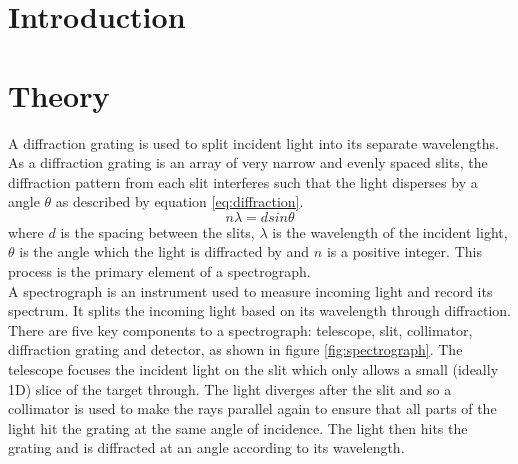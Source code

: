 \documentclass[a4paper,12pt,twocolumn]{article}
\let\cite=\supercite
\begin{document}
	\section{Introduction}
	
	\section{Theory}
		A diffraction grating is used to split incident light into its separate wavelengths. As a diffraction grating is an array of very narrow and evenly spaced slits, the diffraction pattern from each slit interferes such that the light disperses by a angle $\theta$ as described by equation \ref{eq:diffraction}\cite{universityPhysics}.
		\begin{equation}
			n \lambda = d sin\theta
			\label{eq:diffraction}
		\end{equation} where $d$ is the spacing between the slits, $\lambda$ is the wavelength of the incident light, $\theta$ is the angle which the light is diffracted by and $n$ is a positive integer. This process is the primary element of a spectrograph.\\
	
		A spectrograph is an instrument used to measure incoming light and record its spectrum\cite{atnf}. It splits the incoming light based on its wavelength through diffraction. There are five key components to a spectrograph: telescope, slit, collimator, diffraction grating and detector, as shown in figure \ref{fig:spectrograph}. The telescope focuses the incident light on the slit which only allows a small (ideally 1D) slice of the target through\cite{manual}. The light diverges after the slit and so a collimator is used to make the rays parallel again to ensure that all parts of the light hit the grating at the same angle of incidence. The light then hits the grating and is diffracted at an angle according to its wavelength.
		
\end{document}

